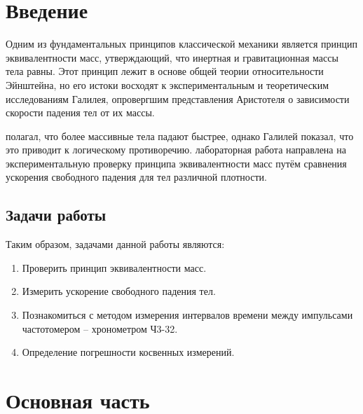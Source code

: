 

\section{Введение}
Одним из фундаментальных принципов классической механики является принцип эквивалентности масс, утверждающий, что инертная и гравитационная массы тела равны. Этот принцип лежит в основе общей теории относительности Эйнштейна, но его истоки восходят к экспериментальным и теоретическим исследованиям Галилея, опровергшим представления Аристотеля о зависимости скорости падения тел от их массы.

 полагал, что более массивные тела падают быстрее, однако Галилей показал, что это приводит к логическому противоречию. 
 лабораторная работа направлена на экспериментальную проверку принципа эквивалентности масс путём сравнения ускорения свободного падения для тел различной плотности.




\subsection{Задачи работы}

Таким образом, задачами данной работы являются:
\begin{enumerate}
    \item Проверить принцип эквивалентности масс.
    \item Измерить ускорение свободного падения тел.
    \item Познакомиться с методом измерения интервалов времени между импульсами
частотомером – хронометром Ч3-32.
    \item Определение погрешности косвенных измерений.
\end{enumerate}




\section{Основная часть}

